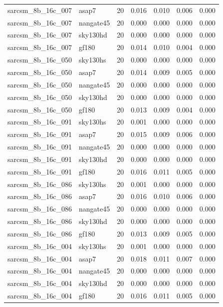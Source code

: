 \begin{tabular}{llrrrrr}
sarcsm\_8b\_16c\_007 & asap7 & 20 & 0.016 & 0.010 & 0.006 & 0.000 \\
sarcsm\_8b\_16c\_007 & nangate45 & 20 & 0.000 & 0.000 & 0.000 & 0.000 \\
sarcsm\_8b\_16c\_007 & sky130hd & 20 & 0.000 & 0.000 & 0.000 & 0.000 \\
sarcsm\_8b\_16c\_007 & gf180 & 20 & 0.014 & 0.010 & 0.004 & 0.000 \\
sarcsm\_8b\_16c\_050 & sky130hs & 20 & 0.000 & 0.000 & 0.000 & 0.000 \\
sarcsm\_8b\_16c\_050 & asap7 & 20 & 0.014 & 0.009 & 0.005 & 0.000 \\
sarcsm\_8b\_16c\_050 & nangate45 & 20 & 0.000 & 0.000 & 0.000 & 0.000 \\
sarcsm\_8b\_16c\_050 & sky130hd & 20 & 0.000 & 0.000 & 0.000 & 0.000 \\
sarcsm\_8b\_16c\_050 & gf180 & 20 & 0.013 & 0.009 & 0.004 & 0.000 \\
sarcsm\_8b\_16c\_091 & sky130hs & 20 & 0.001 & 0.000 & 0.000 & 0.000 \\
sarcsm\_8b\_16c\_091 & asap7 & 20 & 0.015 & 0.009 & 0.006 & 0.000 \\
sarcsm\_8b\_16c\_091 & nangate45 & 20 & 0.000 & 0.000 & 0.000 & 0.000 \\
sarcsm\_8b\_16c\_091 & sky130hd & 20 & 0.000 & 0.000 & 0.000 & 0.000 \\
sarcsm\_8b\_16c\_091 & gf180 & 20 & 0.016 & 0.011 & 0.005 & 0.000 \\
sarcsm\_8b\_16c\_086 & sky130hs & 20 & 0.001 & 0.000 & 0.000 & 0.000 \\
sarcsm\_8b\_16c\_086 & asap7 & 20 & 0.016 & 0.010 & 0.006 & 0.000 \\
sarcsm\_8b\_16c\_086 & nangate45 & 20 & 0.000 & 0.000 & 0.000 & 0.000 \\
sarcsm\_8b\_16c\_086 & sky130hd & 20 & 0.000 & 0.000 & 0.000 & 0.000 \\
sarcsm\_8b\_16c\_086 & gf180 & 20 & 0.013 & 0.009 & 0.005 & 0.000 \\
sarcsm\_8b\_16c\_004 & sky130hs & 20 & 0.001 & 0.000 & 0.000 & 0.000 \\
sarcsm\_8b\_16c\_004 & asap7 & 20 & 0.018 & 0.011 & 0.007 & 0.000 \\
sarcsm\_8b\_16c\_004 & nangate45 & 20 & 0.000 & 0.000 & 0.000 & 0.000 \\
sarcsm\_8b\_16c\_004 & sky130hd & 20 & 0.000 & 0.000 & 0.000 & 0.000 \\
sarcsm\_8b\_16c\_004 & gf180 & 20 & 0.016 & 0.011 & 0.005 & 0.000 \\

\end{tabular}
